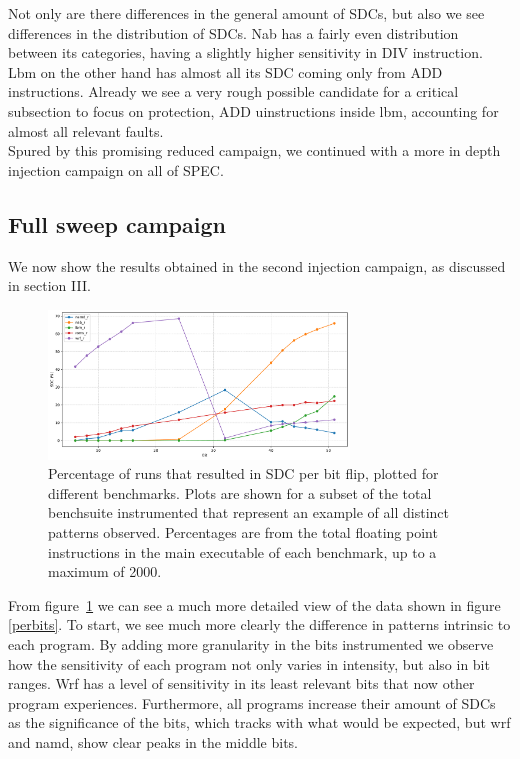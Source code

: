 \documentclass[lettersize,journal]{IEEEtran}
\begin{document}
Not only are there differences in the general amount of SDCs, but also we see differences in the distribution of SDCs. Nab has a fairly even distribution between its categories, having a slightly higher sensitivity in DIV instruction. Lbm on the other hand has almost all its SDC coming only from ADD instructions. Already we see a very rough possible candidate for a critical subsection to focus on protection, ADD uinstructions inside lbm, accounting for almost all relevant faults.\\
Spured by this promising reduced campaign, we continued with a more in depth injection campaign on all of SPEC.

\subsection{Full sweep campaign}
We now show the results obtained in the second injection campaign, as discussed in section III.
\begin{figure}[!t] 
    \centering
    \includegraphics[width=8cm]{plots/sdc_percentage_by_bit.pdf}
\caption{Percentage of runs that resulted in SDC per bit flip, plotted for different benchmarks. Plots are shown for a subset of the total benchsuite instrumented that represent an example of all distinct patterns observed. Percentages are from the total floating point instructions in the main executable of each benchmark, up to a maximum of 2000.}
\label{general}
\end{figure}
From figure~\ref{general} we can see a much more detailed view of the data shown in figure \ref{perbits}. To start, we see much more clearly the difference in patterns intrinsic to each program. By adding more granularity in the bits instrumented we observe how the sensitivity of each program not only varies in intensity, but also in bit ranges. Wrf has a level of sensitivity in its least relevant bits that now other program experiences. Furthermore, all programs increase their amount of SDCs as the significance of the bits, which tracks with what would be expected, but wrf and namd, show clear peaks in the middle bits. \\
\end{document}
